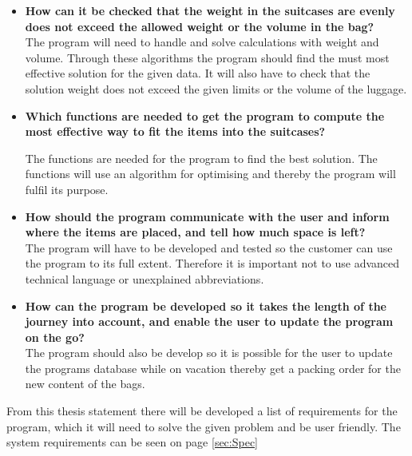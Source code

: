 \begin{itemize}
\item \textbf{How can it be checked that the weight in the suitcases are evenly does not exceed the allowed weight or the volume in the bag?}\\

The program will need to handle and solve calculations with weight and volume. Through these algorithms the program should find the must most effective solution for the given data. It will also have to check that the solution weight does not exceed the given limits or the volume of the luggage.

\item \textbf{Which functions are needed to get the program to compute the most effective way to fit the items into the suitcases?}\newline

The functions are needed for the program to find the best solution. The functions will use an algorithm for optimising and thereby the program will fulfil its purpose.

\item \textbf{How should the program communicate with the user and inform where the items are placed, and tell how much space is left?}\\

The program will have to be developed and tested so the customer can use the program to its full extent. Therefore it is important not to use advanced technical language or unexplained abbreviations.

\item \textbf{How can the program be developed so it takes the length of the journey  into account, and enable the user to update the program on the go?}\\

The program should also be develop so it is possible for the user to update the programs database while on vacation thereby get a packing order for the new content of the bags.
\end{itemize}

From this thesis statement there will be developed a list of requirements for the program, which it will need to solve the given problem and be user friendly. The system requirements can be seen on page \ref{sec:Spec}
